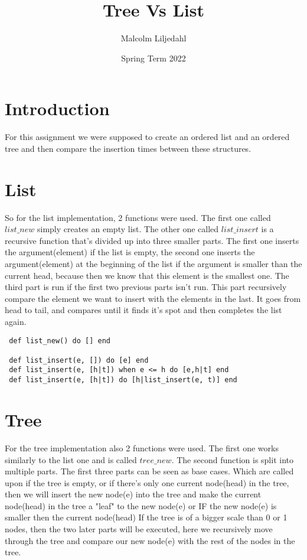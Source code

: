 \documentclass[a4paper,11pt]{article}
\begin{document}
\title{
    \textbf{Tree Vs List}
}
\author{Malcolm Liljedahl}
\date{Spring Term 2022}

\maketitle

\section*{Introduction}

For this assignment we were supposed to create an ordered list and an ordered tree and then compare the insertion times between these structures.

\section{List}

So for the list implementation, 2 functions were used. The first one called $list\_new$ simply creates an empty list. The other one called $list\_insert$ is a recursive function that's divided up into three smaller parts. The first one inserts the argument(element) if the list is empty, the second one inserts the argument(element) at the beginning of the list if the argument is smaller than the current head, because then we know that this element is the smallest one. The third part is run if the first two previous parts isn't run. This part recursively compare the element we want to insert with the elements in the last. It goes from head to tail, and compares until it finds it's spot and then completes the list again.

\begin{verbatim}
 def list_new() do [] end

 def list_insert(e, []) do [e] end
 def list_insert(e, [h|t]) when e <= h do [e,h|t] end
 def list_insert(e, [h|t]) do [h|list_insert(e, t)] end
\end{verbatim}


\section{Tree}

For the tree implementation also 2 functions were used. The first one works similarly to the list one and is called $tree\_new$. The second function is split into multiple parts. The first three parts can be seen as base cases. Which are called upon if the tree is empty, or if there's only one current node(head) in the tree, then we will insert the new node(e) into the tree and make the current node(head) in the tree a "leaf" to the new node(e) or IF the new node(e) is smaller then the current node(head)
If the tree is of a bigger scale than 0 or 1 nodes, then the two later parts will be executed, here we recursively move through the tree and compare our new node(e) with the rest of the nodes in the tree. 
\end{document}
